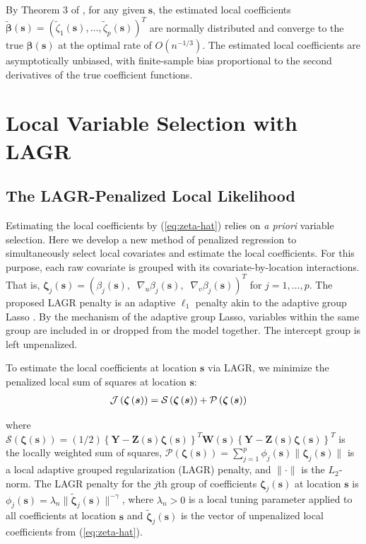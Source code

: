 \documentclass[authoryear,review, 12pt]{elsarticle}
\begin{document}
By Theorem 3 of \citet{Sun-Yan-Zhang-Lu-2014}, for any given $\bm{s}$,
the estimated local coefficients $\tilde{\bm{\beta}}\left(\bm{s}\right)=\left(\tilde{\zeta}_{1}\left(\bm{s}\right),\dots,\tilde{\zeta}_{p}\left(\bm{s}\right)\right)^{T}$
are normally distributed and converge to the true $\bm{\beta}\left(\bm{s}\right)$
at the optimal rate of $O\left(n^{-1/3}\right)$. The estimated local
coefficients are asymptotically unbiased, with finite-sample bias
proportional to the second derivatives of the true coefficient functions.


\section{Local Variable Selection with LAGR\label{sec:lagr-gaussian}}


\subsection{The LAGR-Penalized Local Likelihood}

Estimating the local coefficients by (\ref{eq:zeta-hat}) relies on
\emph{a priori} variable selection. Here we develop a new method of
penalized regression to simultaneously select local covariates and
estimate the local coefficients. For this purpose, each raw covariate
is grouped with its covariate-by-location interactions. That is, $\bm{\zeta}_{j}(\bm{s})=\left(\beta_{j}(\bm{s}),\;\;\nabla_{u}\beta_{j}(\bm{s}),\;\;\nabla_{v}\beta_{j}(\bm{s})\right)^{T}$
for $j=1,\dots,p$. The proposed LAGR penalty is an adaptive $\ell_{1}$
penalty akin to the adaptive group Lasso \citep{Wang-Leng-2008,Zou-2006}.
By the mechanism of the adaptive group Lasso, variables within the
same group are included in or dropped from the model together. The
intercept group is left unpenalized.

To estimate the local coefficients at location $\bm{s}$ via LAGR,
we minimize the penalized local sum of squares at location $\bm{s}$:
\begin{align}
\mathcal{J}\left(\bm{\zeta}\left(\bm{s}\right)\right) & =\mathcal{S}\left(\bm{\zeta}\left(\bm{s}\right)\right)+\mathcal{P}\left(\bm{\zeta}\left(\bm{s}\right)\right)\notag\label{eq:adaptive-lasso-WLS}
\end{align}


where $\mathcal{S}\left(\bm{\zeta}\left(\bm{s}\right)\right)=(1/2)\left\{ \bm{Y}-\bm{Z}(\bm{s})\bm{\zeta}(\bm{s})\right\} ^{T}\bm{W}(\bm{s})\left\{ \bm{Y}-\bm{Z}(\bm{s})\bm{\zeta}(\bm{s})\right\} ^{T}$
is the locally weighted sum of squares, $\mathcal{P}\left(\bm{\zeta}\left(\bm{s}\right)\right)=\sum_{j=1}^{p}\phi_{j}(\bm{s})\|\bm{\zeta}_{j}(\bm{s})\|$
is a local adaptive grouped regularization (LAGR) penalty, and $\|\cdot\|$
is the $L_{2}$-norm. The LAGR penalty for the $j$th group of coefficients
$\bm{\zeta}_{j}(\bm{s})$ at location $\bm{s}$ is $\phi_{j}(\bm{s})=\lambda_{n}\|\tilde{\bm{\zeta}}_{j}(\bm{s})\|^{-\gamma}$,
where $\lambda_{n}>0$ is a local tuning parameter applied to all
coefficients at location $\bm{s}$ and $\tilde{\bm{\zeta}}_{j}(\bm{s})$
is the vector of unpenalized local coefficients from (\ref{eq:zeta-hat}).
\end{document}
